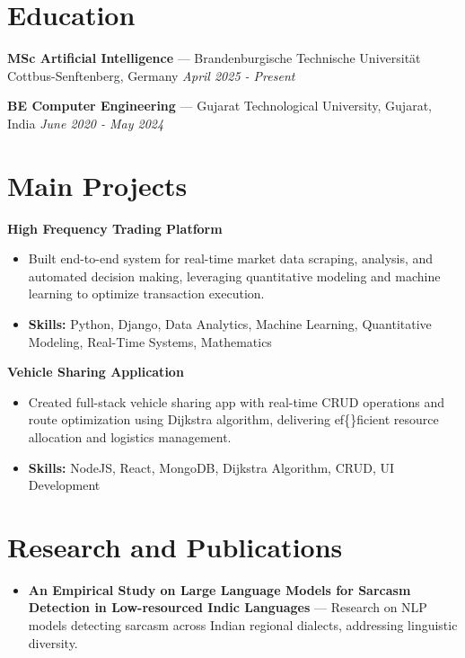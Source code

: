 \documentclass[a4paper,10pt]{article}
\begin{document}
\section*{Education}
\textbf{MSc Artificial Intelligence} — Brandenburgische Technische Universität Cottbus-Senftenberg, Germany \hfill \textit{April 2025 - Present}\par
\vspace{1.5pt}
\textbf{BE Computer Engineering} — Gujarat Technological University, Gujarat, India \hfill \textit{June 2020 - May 2024}\par

\section*{Main Projects}
\textbf{High Frequency Trading Platform}\par
\vspace{1pt}
\begin{itemize}
  \item Built end-to-end system for real-time market data scraping, analysis, and automated decision making, leveraging quantitative modeling and machine learning to optimize transaction execution.
  \item \textbf{Skills:} Python, Django, Data Analytics, Machine Learning, Quantitative Modeling, Real-Time Systems, Mathematics
\end{itemize}
\vspace{3pt}
\textbf{Vehicle Sharing Application}\par
\vspace{1pt}
\begin{itemize}
  \item Created full-stack vehicle sharing app with real-time CRUD operations and route optimization using Dijkstra algorithm, delivering ef\{\}ficient resource allocation and logistics management.
  \item \textbf{Skills:} NodeJS, React, MongoDB, Dijkstra Algorithm, CRUD, UI Development
\end{itemize}

\section*{Research and Publications}
\begin{itemize}
\item \textbf{An Empirical Study on Large Language Models for Sarcasm Detection in Low-resourced Indic Languages} — Research on NLP models detecting sarcasm across Indian regional dialects, addressing linguistic diversity.
\end{itemize}
\end{document}
